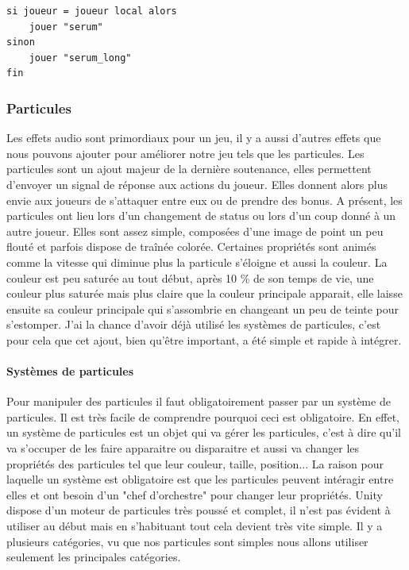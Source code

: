 \documentclass{article}
\begin{document}
\begin{lstlisting}
si joueur = joueur local alors
    jouer "serum"
sinon
    jouer "serum_long"
fin
\end{lstlisting}

\newpage
\subsubsection{Particules}

Les effets audio sont primordiaux pour un jeu, il y a aussi d'autres effets que nous pouvons ajouter pour améliorer notre jeu tels que les particules.
Les particules sont un ajout majeur de la dernière soutenance, elles permettent d'envoyer un signal de réponse aux actions du joueur. Elles donnent alors plus envie aux joueurs de s'attaquer entre eux ou de prendre des bonus.
A présent, les particules ont lieu lors d'un changement de status ou lors d'un coup donné à un autre joueur. Elles sont assez simple, composées d'une image de point un peu flouté et parfois dispose de traînée colorée. Certaines propriétés sont animés comme la vitesse qui diminue plus la particule s'éloigne et aussi la couleur. La couleur est peu saturée au tout début, après 10 \% de son temps de vie, une couleur plus saturée mais plus claire que la couleur principale apparait, elle laisse ensuite sa couleur principale qui s'assombrie en changeant un peu de teinte pour s'estomper.
J'ai la chance d'avoir déjà utilisé les systèmes de particules, c'est pour cela que cet ajout, bien qu'être important, a été simple et rapide à intégrer.

\paragraph{Systèmes de particules}

Pour manipuler des particules il faut obligatoirement passer par un système de particules.
Il est très facile de comprendre pourquoi ceci est obligatoire. En effet, un système de particules est un objet qui va gérer les particules, c'est à dire qu'il va s'occuper de les faire apparaitre ou disparaitre et aussi va changer les propriétés des particules tel que leur couleur, taille, position... La raison pour laquelle un système est obligatoire est que les particules peuvent intéragir entre elles et ont besoin d'un "chef d'orchestre" pour changer leur propriétés.
Unity dispose d'un moteur de particules très poussé et complet, il n'est pas évident à utiliser au début mais en s'habituant tout cela devient très vite simple. Il y a plusieurs catégories, vu que nos particules sont simples nous allons utiliser seulement les principales catégories.
\end{document}
